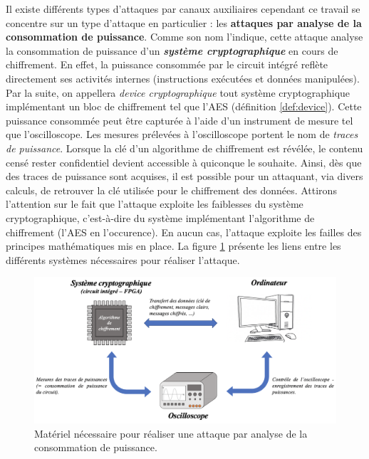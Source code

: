 \documentclass[oneside]{book}
\begin{document}
\newpage
Il existe différents types d'attaques par canaux auxiliaires cependant ce travail se concentre sur un type d'attaque en particulier : les \textbf{attaques par analyse de la consommation de puissance}. Comme son nom l'indique, cette attaque analyse la consommation de puissance d'un \textbf{\textit{système cryptographique}} en cours de chiffrement. En effet, la puissance consommée par le circuit intégré reflète directement ses activités internes (instructions exécutées et données manipulées). Par la suite, on appellera \textit{device cryptographique} tout système cryptographique implémentant un bloc de chiffrement tel que l'AES (définition \ref{def:device}). Cette puissance consommée peut être capturée à l'aide d'un instrument de mesure tel que l'oscilloscope. Les mesures prélevées à l'oscilloscope portent le nom de \textit{traces de puissance}. Lorsque la clé d'un algorithme de chiffrement est révélée, le contenu censé rester confidentiel devient accessible à quiconque le souhaite. Ainsi, dès que des traces de puissance sont acquises, il est possible pour un attaquant, via divers calculs, de retrouver la clé utilisée pour le chiffrement des données. Attirons l'attention sur le fait que l'attaque exploite les faiblesses du système cryptographique, c'est-à-dire du système implémentant l'algorithme de chiffrement (l'AES en l'occurence). En aucun cas, l'attaque exploite les failles des principes mathématiques mis en place. La figure \ref{fig:intro} présente les liens entre les différents systèmes nécessaires pour réaliser l'attaque.

\begin{figure}[h]
    \hspace{-1.55cm}
    \includegraphics[scale=0.71]{image/intro.png}
    \caption{Matériel nécessaire pour réaliser une attaque par analyse de la consommation de puissance.}
    \label{fig:intro}
\end{figure}
\end{document}
